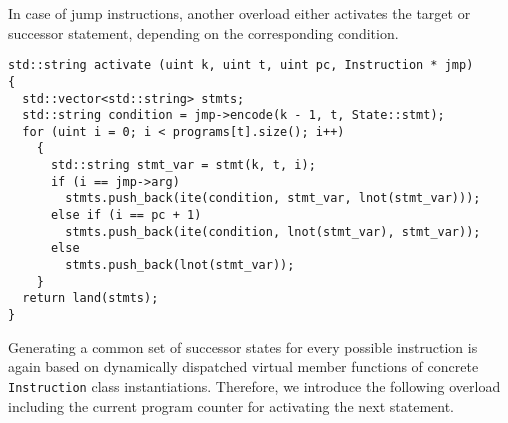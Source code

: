 \noindent
In case of jump instructions, another overload either activates the target or successor statement, depending on the corresponding condition.

\begin{lstlisting}[style=c++]
std::string activate (uint k, uint t, uint pc, Instruction * jmp)
{
  std::vector<std::string> stmts;
  std::string condition = jmp->encode(k - 1, t, State::stmt);
  for (uint i = 0; i < programs[t].size(); i++)
    {
      std::string stmt_var = stmt(k, t, i);
      if (i == jmp->arg)
        stmts.push_back(ite(condition, stmt_var, lnot(stmt_var)));
      else if (i == pc + 1)
        stmts.push_back(ite(condition, lnot(stmt_var), stmt_var));
      else
        stmts.push_back(lnot(stmt_var));
    }
  return land(stmts);
}
\end{lstlisting}



\noindent
Generating a common set of successor states for every possible instruction %
is again based on
dynamically dispatched virtual member functions of concrete \texttt{Instruction} class instantiations.
Therefore, we introduce the following overload including the current program counter for activating the next statement. %

